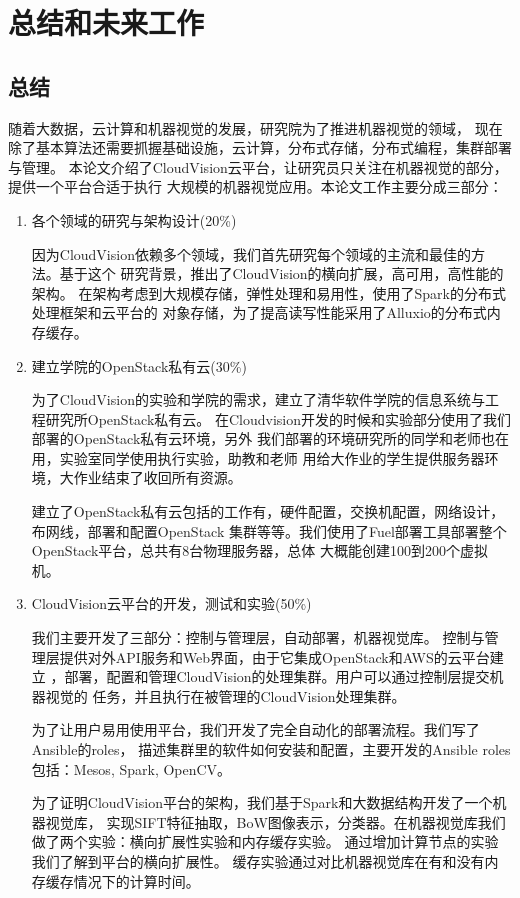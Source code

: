 \chapter{总结和未来工作}

\section{总结}
随着大数据，云计算和机器视觉的发展，研究院为了推进机器视觉的领域，
现在除了基本算法还需要抓握基础设施，云计算，分布式存储，分布式编程，集群部署与管理。
本论文介绍了CloudVision云平台，让研究员只关注在机器视觉的部分，提供一个平台合适于执行
大规模的机器视觉应用。本论文工作主要分成三部分：
\begin{enumerate}
  \item 各个领域的研究与架构设计(20\%)

        因为CloudVision依赖多个领域，我们首先研究每个领域的主流和最佳的方法。基于这个
        研究背景，推出了CloudVision的横向扩展，高可用，高性能的架构。
        在架构考虑到大规模存储，弹性处理和易用性，使用了Spark的分布式处理框架和云平台的
        对象存储，为了提高读写性能采用了Alluxio的分布式内存缓存。

  \item 建立学院的OpenStack私有云(30\%)

        为了CloudVision的实验和学院的需求，建立了清华软件学院的信息系统与工程研究所OpenStack私有云。
        在Cloudvision开发的时候和实验部分使用了我们部署的OpenStack私有云环境，另外
        我们部署的环境研究所的同学和老师也在用，实验室同学使用执行实验，助教和老师
        用给大作业的学生提供服务器环境，大作业结束了收回所有资源。
        
        建立了OpenStack私有云包括的工作有，硬件配置，交换机配置，网络设计，布网线，部署和配置OpenStack
        集群等等。我们使用了Fuel部署工具部署整个OpenStack平台，总共有8台物理服务器，总体
        大概能创建100到200个虚拟机。
  \item CloudVision云平台的开发，测试和实验(50\%)

        我们主要开发了三部分：控制与管理层，自动部署，机器视觉库。
        控制与管理层提供对外API服务和Web界面，由于它集成OpenStack和AWS的云平台建立
        ，部署，配置和管理CloudVision的处理集群。用户可以通过控制层提交机器视觉的
        任务，并且执行在被管理的CloudVision处理集群。

        为了让用户易用使用平台，我们开发了完全自动化的部署流程。我们写了Ansible的roles，
        描述集群里的软件如何安装和配置，主要开发的Ansible roles包括：Mesos, Spark, OpenCV。

        为了证明CloudVision平台的架构，我们基于Spark和大数据结构开发了一个机器视觉库，
        实现SIFT特征抽取，BoW图像表示，分类器。在机器视觉库我们做了两个实验：横向扩展性实验和内存缓存实验。
        通过增加计算节点的实验我们了解到平台的横向扩展性。
        缓存实验通过对比机器视觉库在有和没有内存缓存情况下的计算时间。

\end{enumerate}

